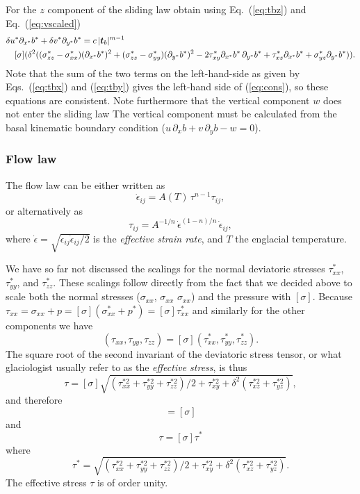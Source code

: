 \documentclass[10pt,a4paper]{book}
\newcommand{\p}{\partial}
\newcommand{\de}{\delta}
\newcommand{\eij}{\dot{\epsilon}_{ij}}
\newcommand{\txy}{\tau_{xy}}
\newcommand{\txz}{\tau_{xz}}
\newcommand{\sxx}{\sigma_{xx}}
\newcommand{\syy}{\sigma_{yy}}
\newcommand{\szz}{\sigma_{zz}}
\begin{document}
For the $z$ component of the sliding law obtain using
Eq.~(\ref{eq:tbz}) and Eq.~(\ref{eq:vscaled})
\begin{eqnarray}
\lefteqn{\de u^* \p_{x^*} b^* +\de v^* \p_{y^*} b^*=c\,|\bm{t}_b|^{m-1}} \label{eq:cons}  \\ 
&&
[\sigma] (\de^2 ( (\szz^*-\sxx^*) (\p_{x^*} b^*)^2 + (\szz^*-\syy^*) (\p_{y^*} b^*)^2
      -2 \txy^* \p_{x^*} b^* \,\p_{y^*} b^* + \txz^* \p_{x^*} b^* + \sigma_{yz}^* \p_{y^*} b^*)). 
\nonumber
\end{eqnarray}
Note that the sum of the two terms on the left-hand-side as given by
Eqs.~(\ref{eq:tbx}) and (\ref{eq:tby}) gives the left-hand side of
(\ref{eq:cons}), so these equations are consistent. Note furthermore
that the vertical component $w$ does not enter the sliding law The
vertical component must be calculated from the basal kinematic
boundary condition ($u \, \p_x b+ v \, \p_y b-w=0$).


\subsubsection{Flow law}
The flow law can be either written as
\begin{equation}
\dot{\epsilon}_{ij}=A(T) \, \tau^{n-1} \tau_{ij},
\end{equation}
or alternatively as
\[
\tau_{ij}=A^{-1/n} \,\dot{\epsilon}^{(1-n)/n}\, \dot{\epsilon}_{ij},
\]
where $\dot{\epsilon}=\sqrt{\eij \eij/2}$ is the {\em effective strain rate}, and $T$ the englacial temperature.
 
We have so far not discussed the scalings for the normal deviatoric
stresses $\tau^*_{xx}$, $\tau^*_{yy}$, and $\tau^*_{zz}$. These scalings
follow directly from the fact that we decided above to scale both the
normal stresses ($\sxx$, $\sxx$ $\sxx$) and the
pressure with $[\sigma]$. Because $\tau_{xx}=\sxx+p=[\sigma]
(\sxx^*+p^*)=[\sigma] \tau_{xx}^*$ and similarly for the other
components we have
\[ 
(\tau_{xx},\tau_{yy},\tau_{zz})= [\sigma] (\tau_{xx}^*,\tau_{yy}^*,\tau_{zz}^*).
\]
The square root of the second invariant of the deviatoric stress
tensor, or what glaciologist usually refer to as the {\em effective
stress}, is thus
\begin{equation}
\tau=[\sigma] \sqrt{ (\tau^{*2}_{xx} +\tau^{*2}_{yy} +\tau^{*2}_{zz})/2 + \tau^{*2}_{xy}+\de^2 (\tau^{*2}_{xz}+\tau^{*2}_{yz})},
\label{eq:taueff}
\end{equation}
and therefore
\begin{equation}
[\tau]= [\sigma]
\label{eq:tst}
\end{equation}
and
\[
\tau=[\sigma] \tau^*
\]
where
\[
\tau^*=\sqrt{ (\tau^{*2}_{xx} +\tau^{*2}_{yy} +\tau^{*2}_{zz})/2 + \tau^{*2}_{xy}+\de^2 (\tau^{*2}_{xz}+\tau^{*2}_{yz})}.
\]
The effective stress $\tau$ is of order unity.
\end{document}
